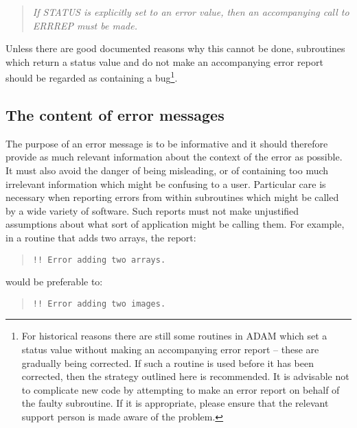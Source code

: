 \documentclass[twoside,11pt]{article}
\newcommand{\xlabel}[1]{}
\renewcommand{\_}{\texttt{\symbol{95}}}
\begin{document}
\begin {quote}
\emph{If STATUS is explicitly set to an error value, then an accompanying
call to ERR\_REP \emph{must} be made.}
\end {quote}

Unless there are good documented reasons why this cannot be done,
subroutines which return a status value and do not make an accompanying
error report should be regarded as containing a bug\footnote{For historical
reasons there are still some routines in ADAM which
set a status value without making an accompanying error report -- these are
gradually being corrected.
If such a routine is used before it has been corrected, then the strategy
outlined here is recommended.
It is advisable not to complicate new code by attempting to make an error
report on behalf of the faulty subroutine.
If it is appropriate, please ensure that the relevant support person is made
aware of the problem.}.

\subsection{\xlabel{the_content_of_error_messages}The content of error messages}

The purpose of an error message is to be informative and it should
therefore provide as much relevant information about the context of the
error as possible.
It must also avoid the danger of being misleading, or of containing
too much irrelevant information which might be confusing to a user.
Particular care is necessary when reporting errors from within subroutines
which might be called by a wide variety of software.
Such reports must not make unjustified assumptions about what sort of
application might be calling them.
For example, in a routine that adds two arrays, the report:

\begin {quote}
\begin {small}
\begin{verbatim}
!! Error adding two arrays.
\end{verbatim}
\end {small}
\end {quote}

would be preferable to:

\begin {quote}
\begin {small}
\begin{verbatim}
!! Error adding two images.
\end{verbatim}
\end {small}
\end {quote}
\end{document}
